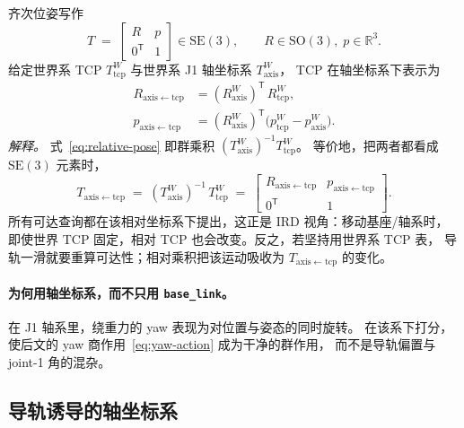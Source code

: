 \documentclass[UTF8,a4paper,11pt,fontset=fandol]{ctexart}
\newcommand{\SE}{\mathrm{SE}}
\newcommand{\SO}{\mathrm{SO}}
\newcommand{\R}{\mathbb{R}}
\newcommand{\Tcp}{T_{\mathrm{tcp}}}
\newcommand{\Taxis}{T_{\mathrm{axis}}}
\begin{document}
齐次位姿写作
\begin{equation}
\label{eq:pose-matrix}
  T
  \;=\;
  \begin{bmatrix}
    R & p \\
    0^{\mathsf T} & 1
  \end{bmatrix}
  \in\SE(3),
  \qquad
  R\in\SO(3),\; p\in\R^{3}.
\end{equation}
给定世界系 TCP \(\Tcp^{W}\) 与世界系 J1 轴坐标系 \(\Taxis^{W}\)，
TCP 在轴坐标系下表示为
\begin{equation}
\label{eq:relative-pose}
\begin{aligned}
  R_{\mathrm{axis\leftarrow tcp}}
  &=
  (R_{\mathrm{axis}}^{W})^{\mathsf T}\, R_{\mathrm{tcp}}^{W},
  \\
  p_{\mathrm{axis\leftarrow tcp}}
  &=
  (R_{\mathrm{axis}}^{W})^{\mathsf T}
  \bigl(p_{\mathrm{tcp}}^{W}-p_{\mathrm{axis}}^{W}\bigr).
\end{aligned}
\end{equation}
\emph{解释。}
式~\eqref{eq:relative-pose} 即群乘积 \((\Taxis^{W})^{-1}\Tcp^{W}\)。
等价地，把两者都看成 \(\SE(3)\) 元素时，
\begin{equation}
\label{eq:relative-group}
  T_{\mathrm{axis\leftarrow tcp}}
  \;=\;
  (\Taxis^{W})^{-1}\,\Tcp^{W}
  \;=\;
  \begin{bmatrix}
    R_{\mathrm{axis\leftarrow tcp}} & p_{\mathrm{axis\leftarrow tcp}} \\
    0^{\mathsf T} & 1
  \end{bmatrix}.
\end{equation}
所有可达查询都在该相对坐标系下提出，这正是 IRD 视角：移动基座/轴系时，
即使世界 TCP 固定，相对 TCP 也会改变。反之，若坚持用世界系 TCP 表，
导轨一滑就要重算可达性；相对乘积把该运动吸收为
\(T_{\mathrm{axis\leftarrow tcp}}\) 的变化。

\paragraph{为何用轴坐标系，而不只用 \texttt{base\_link}。}
在 J1 轴系里，绕重力的 yaw 表现为对位置与姿态的同时旋转。
在该系下打分，使后文的 yaw 商作用~\eqref{eq:yaw-action} 成为干净的群作用，
而不是导轨偏置与 joint-1 角的混杂。

\subsection{导轨诱导的轴坐标系}
\label{sec:rail}
\end{document}
